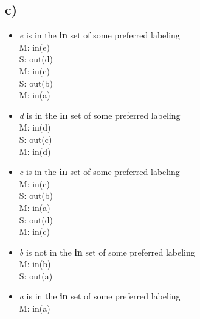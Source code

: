 \documentclass[a4paper]{article}
\begin{document}
\subsection{c)}
\begin{itemize}
\item \emph{e} is in the \textbf{in} set of some preferred labeling\\
M: in(e)\\
S: out(d)\\
M: in(c)\\
S: out(b)\\
M: in(a)
\item \emph{d} is in the \textbf{in} set of some preferred labeling\\
M: in(d)\\
S: out(c)\\
M: in(d)\\
\item \emph{c} is in the \textbf{in} set of some preferred labeling\\
M: in(c)\\
S: out(b)\\
M: in(a)\\
S: out(d)\\
M: in(c)\\
\item \emph{b} is not in the \textbf{in} set of some preferred labeling\\
M: in(b)\\
S: out(a)\\
\item \emph{a} is in the \textbf{in} set of some preferred labeling\\
M: in(a)\\
\end{itemize}
\end{document}
